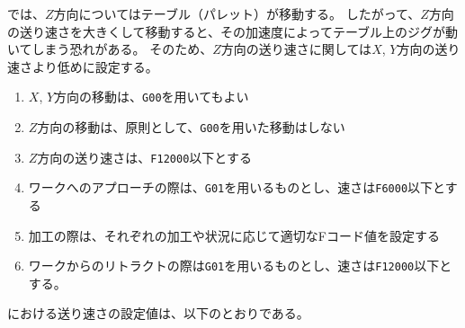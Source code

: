 \DMname では、$Z$方向についてはテーブル（パレット）が移動する。
したがって、$Z$方向の送り速さを大きくして移動すると、その加速度によってテーブル上のジグが動いてしまう恐れがある。
そのため、$Z$方向の送り速さに関しては$X$, $Y$方向の送り速さより低めに設定する。
\begin{enumerate}[label=\Roman*., ref=\Roman*]
\item $X$, $Y$方向の移動は、\verb|G00|を用いてもよい
\item $Z$方向の移動は、原則として、\verb|G00|を用いた移動はしない
\item $Z$方向の送り速さは、\verb|F12000|以下とする
\item {}ワークへのアプローチの際は、\verb|G01|を用いるものとし、速さは\verb|F6000|以下とする
\item 加工の際は、それぞれの加工や状況に応じて適切なFコード値を設定する
\item ワークからのリトラクトの際は\verb|G01|を用いるものとし、速さは\verb|F12000|以下とする。
\end{enumerate}


\clearpage
\noindent
\dateKouguSpeed における送り速さの設定値は、以下のとおりである。\\

